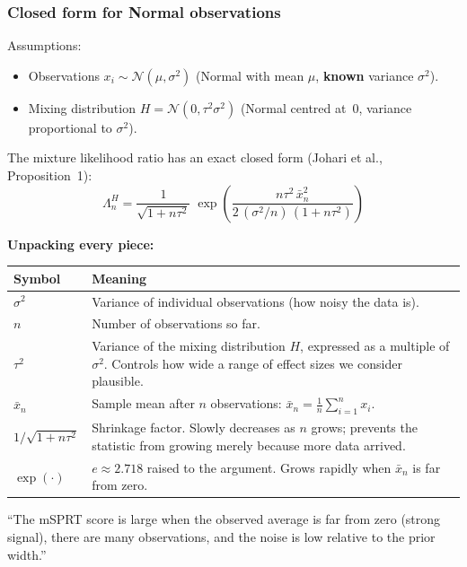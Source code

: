 \documentclass[12pt, a4paper]{article}
\newcommand{\LR}{\Lambda}              %
\begin{document}
\subsubsection*{Closed form for Normal observations}

Assumptions:
\begin{itemize}[nosep]
  \item Observations $x_i \sim \mathcal{N}(\mu, \sigma^2)$
        (Normal with mean $\mu$, \textbf{known} variance $\sigma^2$).
  \item Mixing distribution $H = \mathcal{N}(0, \tau^2\sigma^2)$
        (Normal centred at~0, variance proportional to $\sigma^2$).
\end{itemize}

The mixture likelihood ratio has an exact closed form (Johari et al.,
Proposition~1):
\[
  \boxed{\LR_n^{H}
  = \frac{1}{\sqrt{1 + n\tau^2}}
    \;\exp\!\left(
      \frac{n\tau^2\, \bar{x}_n^2}
           {2\,(\sigma^2/n)\,(1 + n\tau^2)}
    \right)}
\]

\textbf{Unpacking every piece:}

\begin{center}
\renewcommand{\arraystretch}{1.4}
\begin{tabular}{@{} >{\raggedright}p{3cm} p{9cm} @{}}
\toprule
\textbf{Symbol} & \textbf{Meaning} \\
\midrule
$\sigma^2$ & Variance of individual observations (how noisy the data is). \\
$n$ & Number of observations so far. \\
$\tau^2$ & Variance of the mixing distribution $H$, expressed as a multiple
  of $\sigma^2$.  Controls how wide a range of effect sizes we consider
  plausible. \\
$\bar{x}_n$ & Sample mean after $n$ observations:
  $\bar{x}_n = \frac{1}{n}\sum_{i=1}^n x_i$. \\
$1/\sqrt{1 + n\tau^2}$ & Shrinkage factor.  Slowly decreases as $n$ grows;
  prevents the statistic from growing merely because more data arrived. \\
$\exp(\cdot)$ & $e \approx 2.718$ raised to the argument.  Grows rapidly
  when $\bar{x}_n$ is far from zero. \\
\bottomrule
\end{tabular}
\end{center}

\begin{plainlanguage}
``The mSPRT score is large when the observed average is far from zero (strong
signal), there are many observations, and the noise is low relative to the
prior width.''
\end{plainlanguage}
\end{document}

